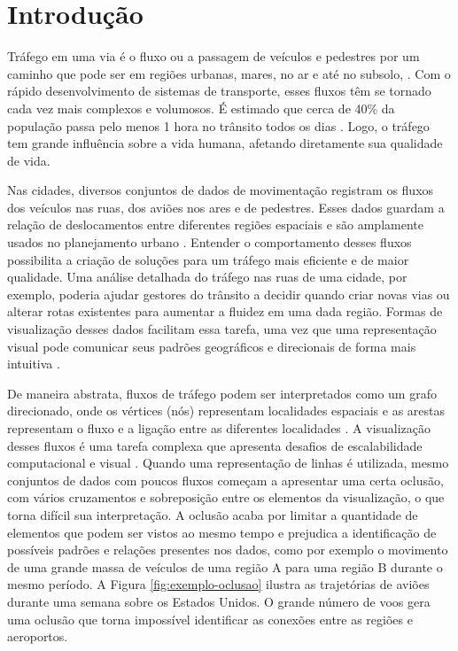 \chapter{Introdução}
\label{cap:introducao}

  Tráfego em uma via é o fluxo ou a passagem de veículos e pedestres por
um caminho que pode ser em regiões urbanas, mares,
no ar e até no subsolo, \citep{Chen2015}. Com o rápido desenvolvimento de
sistemas de transporte, esses fluxos têm se tornado cada vez mais complexos e
volumosos.  É estimado que cerca de 40\% da população passa pelo menos 1 hora
no trânsito todos os dias \citep{Zhang2011}. Logo, o tráfego tem grande
influência sobre a vida humana, afetando diretamente sua qualidade de vida.

Nas cidades, diversos conjuntos de dados de movimentação registram os fluxos
dos veículos nas ruas, dos aviões nos ares e de pedestres. Esses dados guardam
a relação de deslocamentos entre diferentes regiões espaciais e são amplamente
usados no planejamento urbano \citep{Anita2017}.  Entender o comportamento
desses fluxos possibilita a criação de soluções para um tráfego mais eficiente
e de maior qualidade. Uma análise detalhada do tráfego nas ruas de uma cidade,
por exemplo, poderia ajudar gestores do trânsito a decidir quando criar novas vias
ou alterar rotas existentes para aumentar a fluidez em uma dada região. Formas
de visualização desses dados facilitam essa tarefa, uma vez que uma representação
visual pode comunicar seus padrões geográficos e direcionais de forma mais intuitiva
\citep{Liu2013}.

  De maneira abstrata, fluxos de tráfego podem ser interpretados como um grafo
direcionado, onde os vértices (nós) representam localidades espaciais e as
arestas representam o fluxo e a ligação entre as diferentes localidades
\citep{Anita2017}. A visualização desses fluxos é uma tarefa complexa que
apresenta desafios de escalabilidade computacional e visual \citep{Klein2014}.
Quando uma representação de linhas é utilizada, mesmo conjuntos de dados com
poucos fluxos começam a apresentar uma certa oclusão, com vários cruzamentos e
sobreposição entre os elementos da visualização, o que torna difícil sua
interpretação. A oclusão acaba por limitar a quantidade de elementos que podem
ser vistos ao mesmo tempo e prejudica a identificação de possíveis padrões e
relações presentes nos dados, como por exemplo o movimento de uma grande massa
de veículos de uma região A para uma região B durante o mesmo período. A Figura
\ref{fig:exemplo-oclusao} ilustra as trajetórias de aviões durante uma semana
sobre os Estados Unidos. O grande número de voos gera uma oclusão que torna
impossível identificar as conexões entre as regiões e aeroportos.

